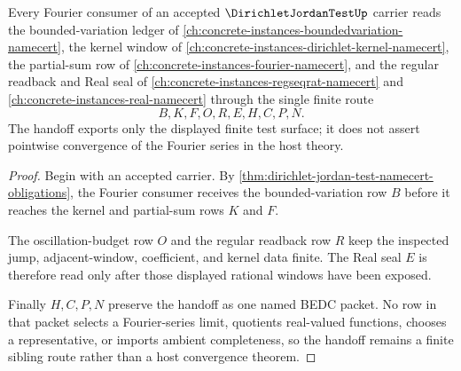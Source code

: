 \begin{theorem}
\label{thm:dirichlet-jordan-test-fourier-handoff}
Every Fourier consumer of an accepted $\DirichletJordanTestUp$ carrier reads the bounded-variation ledger of \autoref{ch:concrete-instances-boundedvariation-namecert}, the kernel window of \autoref{ch:concrete-instances-dirichlet-kernel-namecert}, the partial-sum row of \autoref{ch:concrete-instances-fourier-namecert}, and the regular readback and Real seal of \autoref{ch:concrete-instances-regseqrat-namecert} and \autoref{ch:concrete-instances-real-namecert} through the single finite route
$$
B,K,F,O,R,E,H,C,P,N.
$$
The handoff exports only the displayed finite test surface; it does not assert pointwise convergence of the Fourier series in the host theory.
\end{theorem}
\begin{proof}
Begin with an accepted carrier. By \autoref{thm:dirichlet-jordan-test-namecert-obligations}, the Fourier consumer receives the bounded-variation row $B$ before it reaches the kernel and partial-sum rows $K$ and $F$.

The oscillation-budget row $O$ and the regular readback row $R$ keep the inspected jump, adjacent-window, coefficient, and kernel data finite. The Real seal $E$ is therefore read only after those displayed rational windows have been exposed.

Finally $H,C,P,N$ preserve the handoff as one named BEDC packet. No row in that packet selects a Fourier-series limit, quotients real-valued functions, chooses a representative, or imports ambient completeness, so the handoff remains a finite sibling route rather than a host convergence theorem.
\end{proof}


\begin{closurestatus}{\DirichletJordanTestUp}
  \theoryclosure{\seedClosure}
  \formalstatus{\unformalizedV}
\end{closurestatus}
